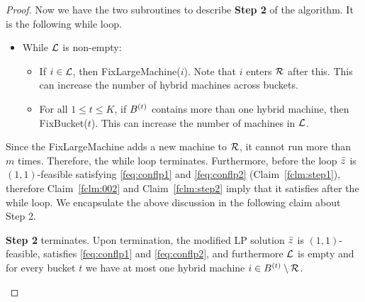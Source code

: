 \begin{proof}
	
%	
%	
\noindent
Now we have the two subroutines to describe {\bf Step 2} of the algorithm. It is the following while loop.
   \begin{itemize}[noitemsep]
   	\item[{}] While ${\cal L}$ is non-empty:
   	\begin{itemize}[noitemsep]
   		\item If $i\in {\cal L}$, then {\sf FixLargeMachine}($i$). Note that $i$ enters ${\cal R}$ after this. This can increase the number of hybrid machines across buckets.
   		\item For all $1\leq t\leq K$, if $B^{(t)}$ contains more than one hybrid machine, then {\sf FixBucket}($t$). This can increase the number of machines in ${\cal L}$.
   	\end{itemize}
   \end{itemize}

%
	  Since the {\sf FixLargeMachine} adds a new machine to ${\cal R}$, it cannot run more than $m$ times. Therefore, the while loop terminates. Furthermore, before the loop $\bar z$ is $(1,1)$-feasible satisfying \eqref{feq:conflp1} and \eqref{feq:conflp2} (Claim~\ref{fclm:step1}), therefore Claim~\ref{fclm:002} and Claim~\ref{fclm:step2} imply that it satisfies after the while loop. We encapsulate the above discussion in the following claim about Step 2.
   \begin{claim}\label{fclm:003}
   	{\bf Step 2} terminates. Upon termination, the modified LP solution $\bar z$ is $(1,1)$-feasible, satisfies \eqref{feq:conflp1} and \eqref{feq:conflp2}, and furthermore
   	${\cal L}$ is empty and for every bucket $t$ we have at most one hybrid machine $i\in B^{(t)}\setminus{\cal R}$.
   	\end{claim}
   	\smallskip
   	




\end{proof}
